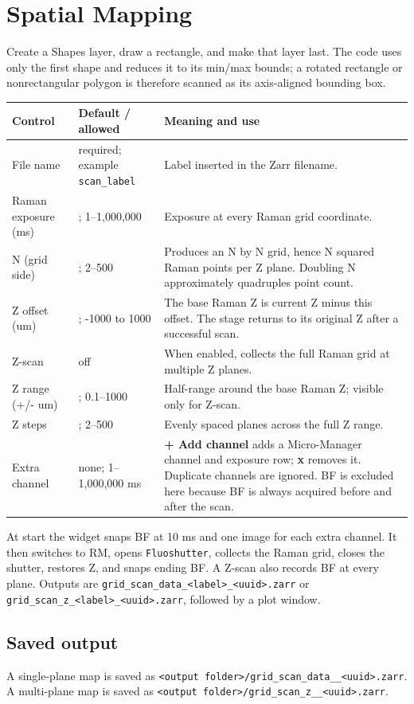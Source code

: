 \documentclass[11pt,oneside]{report}
\makeatletter
\newcommand{\ui}[1]{\textbf{#1}}
\newcommand{\code}[1]{\texttt{#1}}
\newcommand{\fieldtable}{\begin{longtable}{@{}>{\raggedright\arraybackslash}p{0.25\textwidth}>{\raggedright\arraybackslash}p{0.18\textwidth}>{\raggedright\arraybackslash}p{0.50\textwidth}@{}}\toprule\textbf{Control} & \textbf{Default / allowed} & \textbf{Meaning and use}\\\midrule\endhead}
\newcommand{\finishfieldtable}{\bottomrule\end{longtable}}
\makeatother
\begin{document}
\chapter{Spatial Mapping}

Create a Shapes layer, draw a rectangle, and make that layer last. The code uses
only the first shape and reduces it to its min/max bounds; a rotated rectangle or
nonrectangular polygon is therefore scanned as its axis-aligned bounding box.

\fieldtable
File name & required; example \code{scan\_label} & Label inserted in the Zarr filename.\\
Raman exposure (ms) & 1000; 1--1,000,000 & Exposure at every Raman grid coordinate.\\
N (grid side) & 20; 2--500 & Produces an N by N grid, hence N squared Raman points
per Z plane. Doubling N approximately quadruples point count.\\
Z offset (um) & 4; -1000 to 1000 & The base Raman Z is current Z minus this
offset. The stage returns to its original Z after a successful scan.\\
Z-scan & off & When enabled, collects the full Raman grid at multiple Z planes.\\
Z range (+/- um) & 5; 0.1--1000 & Half-range around the base Raman Z; visible only
for Z-scan.\\
Z steps & 10; 2--500 & Evenly spaced planes across the full Z range.\\
Extra channel & none; 1--1,000,000 ms & \ui{+ Add channel} adds a Micro-Manager
channel and exposure row; \ui{x} removes it. Duplicate channels are ignored. BF is
excluded here because BF is always acquired before and after the scan.\\
\finishfieldtable

At start the widget snaps BF at 10 ms and one image for each extra channel. It then
switches to RM, opens \code{Fluoshutter}, collects the Raman grid, closes the shutter,
restores Z, and snaps ending BF. A Z-scan also records BF at every plane. Outputs are
\code{grid\_scan\_data\_<label>\_<uuid>.zarr} or
\code{grid\_scan\_z\_<label>\_<uuid>.zarr}, followed by a plot window.

\section*{Saved output}
A single-plane map is saved as
\code{<output folder>/grid\_scan\_data\_<File name>\_<uuid>.zarr}. A multi-plane
map is saved as
\code{<output folder>/grid\_scan\_z\_<File name>\_<uuid>.zarr}.
\end{document}
